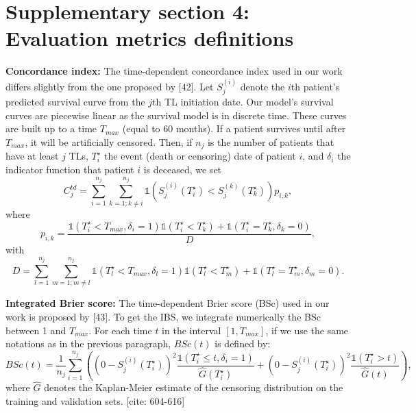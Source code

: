 \documentclass[a4paper,10pt]{article}
\begin{document}
\section*{Supplementary section 4: Evaluation metrics definitions}
\textbf{Concordance index:} The time-dependent concordance index used in our work differs slightly from the one proposed by [42]. Let $S^{(i)}_j$ denote the $i$th patient's predicted survival curve from the $j$th TL initiation date. Our model's survival curves are piecewise linear as the survival model is in discrete time. These curves are built up to a time $T_{max}$ (equal to 60 months). If a patient survives until after $T_{max}$, it will be artificially censored. Then, if $n_j$ is the number of patients that have at least $j$ TLs, $T^\star_i$ the event (death or censoring) date of patient $i$, and $\delta_i$ the indicator function that patient $i$ is deceased, we set
\begin{equation}
C^{td}_j = \sum_{i=1}^{n_j} \sum_{k=1; k\ne i}^{n_j} \mathbb{1}(S^{(i)}_j(T^\star_i) < S^{(k)}_j(T^\star_k)) p_{i,k},
\end{equation}
where
\begin{equation}
p_{i,k} = \frac{\mathbb{1}(T^\star_i < T_{max}, \delta_i = 1) \mathbb{1}(T^\star_i < T^\star_k) + \mathbb{1}(T^\star_i = T^\star_k, \delta_k = 0)}{D},
\end{equation}
with
\begin{equation}
D = \sum_{l=1}^{n_j} \sum_{m=1; m\ne l}^{n_j} \mathbb{1}(T^\star_l < T_{max}, \delta_l = 1) \mathbb{1}(T^\star_l < T^\star_m) + \mathbb{1}(T^\star_l = T^\star_m, \delta_m = 0).
\end{equation}

\textbf{Integrated Brier score:} The time-dependent Brier score (BSc) used in our work is proposed by [43]. To get the IBS, we integrate numerically the BSc between 1 and $T_{max}$. For each time $t$ in the interval $[1, T_{max}]$, if we use the same notations as in the previous paragraph, $BSc(t)$ is defined by:
\begin{equation}
BSc(t) = \frac{1}{n_j} \sum_{i=1}^{n_j} \left( (0 - S^{(i)}_j(T^\star_i))^2 \frac{\mathbb{1}(T^\star_i \le t, \delta_i = 1)}{\hat{G}(T^\star_i)} + (0 - S^{(i)}_j(T^\star_i))^2 \frac{\mathbb{1}(T^\star_i > t)}{\hat{G}(t)} \right),
\end{equation}
where $\hat{G}$ denotes the Kaplan-Meier estimate of the censoring distribution on the training and validation sets. [cite: 604-616]
\end{document}
